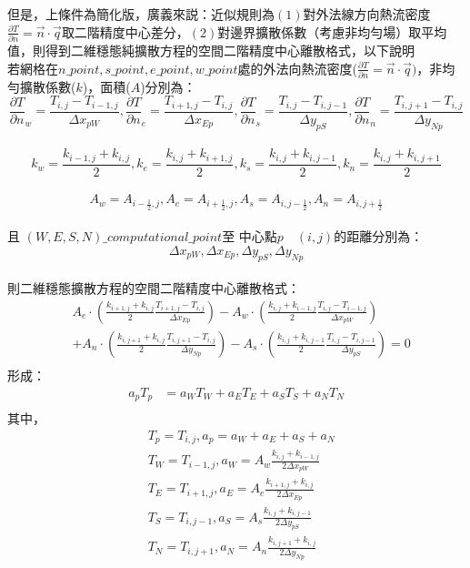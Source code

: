 \documentclass[12pt]{article}
\begin{document}
但是，上條件為簡化版，廣義來説：近似規則為$(1)$對外法線方向熱流密度$\frac{\partial T}{\partial n} =\vec{n}\cdot  \vec{q}$取二階精度中心差分，$(2)$對邊界擴散係數（考慮非均勻場）取平均值，則得到二維穩態純擴散方程的空間二階精度中心離散格式，以下說明\\
\noindent 若網格在$n\_point,s\_point,e\_point,w\_point $處的外法向熱流密度($\frac{\partial T}{\partial n} =\vec{n}\cdot  \vec{q})$，非均勻擴散係數($k$)，面積($A$)分別為：\\
\noindent $$\frac{\partial T}{\partial n}_{w} = \frac{T_{i,j}-T_{i-1,j}}{\Delta x_{pW}}, \frac{\partial T}{\partial n}_{e} = \frac{T_{i+1,j}-T_{i,j}}{\Delta x_{Ep}}, \frac{\partial T}{\partial n}_{s} = \frac{T_{i,j}-T_{i,j-1}}{\Delta y_{pS}}, \frac{\partial T}{\partial n}_{n} = \frac{T_{i,j+1}-T_{i,j}}{\Delta y_{Np}}$$\\
\noindent $$k_{w} = \frac{k_{i-1,j}+k_{i,j}}{2}, k_{e} = \frac{k_{i,j}+k_{i+1,j}}{2}, k_{s}  = \frac{k_{i,j}+k_{i,j-1}}{2}, k_{n} = \frac{k_{i,j}+k_{i,j+1}}{2}$$\\
\noindent $$A_{w} = A_{i-\frac{1}{2},j}, A_{e} = A_{i+\frac{1}{2},j}, A_{s}  = A_{i,j-\frac{1}{2}}, A_{n} = A_{i,j+\frac{1}{2}}$$\\
\noindent 且 $(W,E,S,N)\_computational\_point$至 中心點$p\quad (i,j)$的距離分別為：$$\Delta x_{pW} , \Delta x_{Ep} , \Delta y_{pS} , \Delta y_{Np}$$\\
\noindent 則二維穩態擴散方程的空間二階精度中心離散格式：
\begin{equation}
    \begin{split}
 &A_{e}   \cdot (\frac{k_{i+1,j}+k_{i,j}}{2} \frac{T_{i+1,j}-T_{i,j}}{\Delta x_{Ep}})- A_{w}   \cdot (\frac{k_{i,j}+k_{i-1,j}}{2} \frac{T_{i,j}-T_{i-1,j}}{\Delta x_{pW}})\\
 &+ A_{n}   \cdot (\frac{k_{i,j+1}+k_{i,j}}{2} \frac{T_{i,j+1}-T_{i,j}}{\Delta y_{Np}})- A_{s}   \cdot (\frac{k_{i,j}+k_{i,j-1}}{2} \frac{T_{i,j}-T_{i,j-1}}{\Delta y_{pS}}) = 0\\
\end{split}
\end{equation}
形成：
\begin{equation}
    \begin{split}
        a_{p}T_{p} &= a_{W}T_{W} + a_{E}T_{E} +  a_{S}T_{S} + a_{N}T_{N}  \\
    \end{split}
\end{equation}
\noindent 其中，
\begin{equation}
    \begin{split}
        &T_{p} = T_{i,j} , a_{p} = a_{W} + a_{E} + a_{S} + a_{N}\\
        &T_{W} = T_{i-1,j}, a_{W} = A_{w}\frac{k_{i,j}+k_{i-1,j}}{2 \Delta x_{pW}} \\
        &T_{E} = T_{i+1,j}, a_{E} = A_{e}\frac{k_{i+1,j}+k_{i,j}}{2\Delta x_{Ep}}\\
        &T_{S} = T_{i,j-1}, a_{S} = A_{s}\frac{k_{i,j}+k_{i,j-1}}{2\Delta y_{pS}}\\
        &T_{N} = T_{i,j+1}, a_{N} = A_{n}\frac{k_{i,j+1}+k_{i,j}}{2\Delta y_{Np}}\\
    \end{split}
\end{equation}
\end{document}
